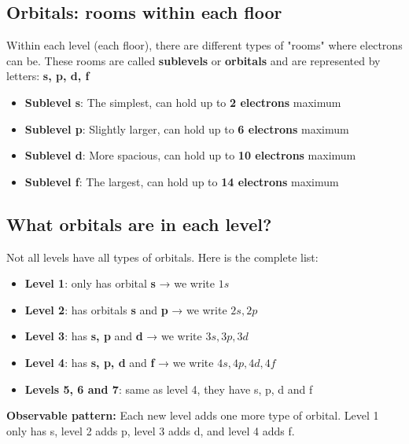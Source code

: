 \subsection{Orbitals: rooms within each floor}
Within each level (each floor), there are different types of "rooms" where electrons can be. These rooms are called \textbf{sublevels} or \textbf{orbitals} and are represented by letters: \textbf{s, p, d, f}
\begin{itemize}
    \item \textbf{Sublevel s}: The simplest, can hold up to \textbf{2 electrons} maximum
    \item \textbf{Sublevel p}: Slightly larger, can hold up to \textbf{6 electrons} maximum
    \item \textbf{Sublevel d}: More spacious, can hold up to \textbf{10 electrons} maximum
    \item \textbf{Sublevel f}: The largest, can hold up to \textbf{14 electrons} maximum
\end{itemize}
\subsection{What orbitals are in each level?}
Not all levels have all types of orbitals. Here is the complete list:
\begin{itemize}
    \item \textbf{Level 1}: only has orbital \textbf{s} → we write \( 1s \)
    \item \textbf{Level 2}: has orbitals \textbf{s} and \textbf{p} → we write \( 2s, 2p \)
    \item \textbf{Level 3}: has \textbf{s, p} and \textbf{d} → we write \( 3s, 3p, 3d \)
    \item \textbf{Level 4}: has \textbf{s, p, d} and \textbf{f} → we write \( 4s, 4p, 4d, 4f \)
    \item \textbf{Levels 5, 6 and 7}: same as level 4, they have s, p, d and f
\end{itemize}
\begin{remark}
    \textbf{Observable pattern:} Each new level adds one more type of orbital. Level 1 only has s, level 2 adds p, level 3 adds d, and level 4 adds f.
\end{remark}
